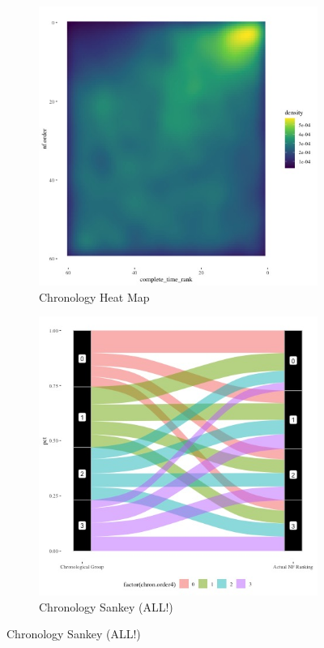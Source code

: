 \documentclass[12pt,letterpaper]{article}
\begin{document}
\begin{figure}[ht]

    \begin{subfigure}{.5\textwidth} 
        \centering
        \includegraphics[width=1\linewidth]{Output/Graphs/Audit/Heatmaps/US NF chron rank by nf rank - smooth.jpg}   
        \caption{Chronology Heat Map}
        \label{fig:sub-first}
        \end{subfigure}
    \begin{subfigure}{.5\textwidth}
        \centering
        \includegraphics[width=1\linewidth]{Output/Graphs/Audit/Sankey flows/US NF chronology to actual.jpg}  
        \caption{Chronology Sankey (ALL!)}
        \label{fig:sub-second}
    \end{subfigure}


\end{figure}
\end{document}

